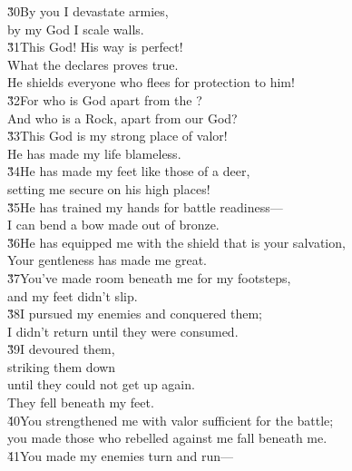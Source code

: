 \begin{poetry}
\poeml \v{30}By you I devastate armies, \\
\poemll    by my God I scale walls. \\
\poeml \v{31}This God! His way is perfect! \\
\poemll    What the  declares proves true. \\
\poemlll       He shields everyone who flees for protection to him! \\
\poeml \v{32}For who is God apart from the ? \\
\poemll    And who is a Rock, apart from our God? \\
\poeml \v{33}This God is my strong place of valor! \\
\poemll    He has made my life blameless. \\
\poeml \v{34}He has made my feet like those of a deer, \\
\poemll    setting me secure on his high places! \\
\poeml \v{35}He has trained my hands for battle readiness--- \\
\poemll    I can bend a bow made out of bronze. \\
\poeml \v{36}He has equipped me with the shield that is your salvation, \\
\poemll    Your gentleness has made me great. \\
\poeml \v{37}You've made room beneath me for my footsteps, \\
\poemll    and my feet didn't slip. \\
\poeml \v{38}I pursued my enemies and conquered them; \\
\poemll    I didn't return until they were consumed. \\
\poeml \v{39}I devoured them, \\
\poemll    striking them down \\
\poeml until they could not get up again. \\
\poemll    They fell beneath my feet. \\
\poeml \v{40}You strengthened me with valor sufficient for the battle; \\
\poemll    you made those who rebelled against me fall beneath me. \\
\poeml \v{41}You made my enemies turn and run--- \\

\end{poetry}

